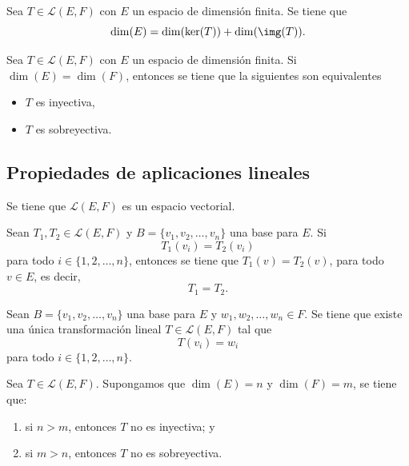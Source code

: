\documentclass[a4,11pt]{aleph-notas}
\begin{document}
\begin{teo}
    Sea $T \in \mathcal{L}(E,F)$ con $E$ un espacio de dimensión finita. Se tiene que
    \[
        \dim(E) = \dim(\ker(T)) +  \dim(\img(T)).
    \]
\end{teo}   

\begin{teo}
    Sea $T \in \mathcal{L}(E,F)$ con $E$ un espacio de dimensión finita. Si $\dim(E)=\dim(F)$, entonces se tiene que la siguientes son equivalentes
    \begin{itemize}
        \item $T$ es inyectiva,
        \item $T$ es sobreyectiva.
    \end{itemize}
\end{teo}   

\subsection{Propiedades de aplicaciones lineales}

\begin{teo}
    Se tiene que $\mathcal{L}(E,F)$ es un espacio vectorial.
\end{teo}


\begin{teo}
    Sean $T_1,T_2 \in \mathcal{L}(E,F)$ y $B= \{v_1, v_2, \ldots, v_n\}$ una base para $E$. Si
    \[
        T_1(v_i) = T_2(v_i)
    \]
    para todo $i \in \{1, 2, \ldots, n\}$, entonces se tiene que $T_1(v)=T_2(v)$, para todo $v\in E$, es decir, 
    \[
        T_1 = T_2.
    \]
\end{teo}

\begin{teo}
    Sean $B= \{v_1, v_2, \ldots, v_n\}$ una base para $E$ y $w_1, w_2, \ldots, w_n\in F$. Se tiene que existe una única transformación lineal $T \in \mathcal{L}(E,F)$ tal que
    \[
        T(v_i) = w_i
    \]
    para todo $i\in \{1, 2, \ldots, n\}$.
\end{teo}


\begin{teo}
    Sea $T \in \mathcal{L}(E,F)$. Supongamos que $\dim(E) = n$ y $\dim(F) = m$, se tiene que:
    \begin{enumerate}
        \item si $n > m$, entonces $T$ no es inyectiva; y
        \item si $m > n$, entonces $T$ no es sobreyectiva.
    \end{enumerate}
\end{teo} 
\end{document}
